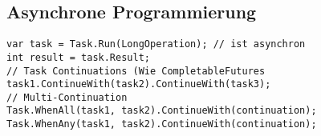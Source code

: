 \subsection{Asynchrone Programmierung}
\begin{lstlisting}
var task = Task.Run(LongOperation); // ist asynchron
int result = task.Result;
// Task Continuations (Wie CompletableFutures
task1.ContinueWith(task2).ContinueWith(task3);
// Multi-Continuation
Task.WhenAll(task1, task2).ContinueWith(continuation);
Task.WhenAny(task1, task2).ContinueWith(continuation);
\end{lstlisting}